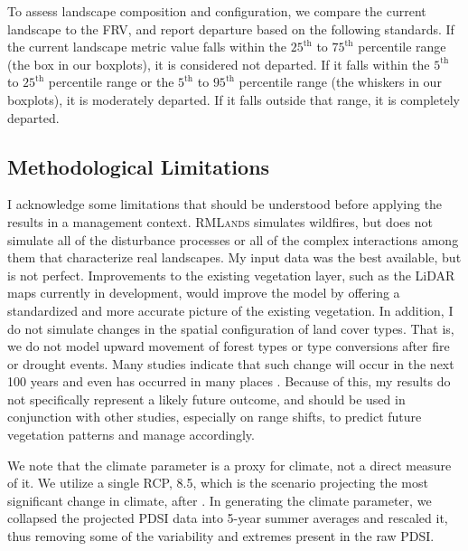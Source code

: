 To assess landscape composition and configuration, we compare the current landscape to the FRV, and report departure based on the following standards. If the current landscape metric value falls within the $25^{\text{th}}$ to $75^{\text{th}}$ percentile range (the box in our boxplots), it is considered not departed. If it falls within the $5^{\text{th}}$ to $25^{\text{th}}$ percentile range or the $5^{\text{th}}$ to $95^{\text{th}}$ percentile range (the whiskers in our boxplots), it is moderately departed. If it falls outside that range, it is completely departed.



\subsection*{Methodological Limitations}
I acknowledge some limitations that should be understood before applying the results in a management context. \textsc{RMLands} simulates wildfires, but does not simulate all of the disturbance processes or all of the complex interactions among them that characterize real landscapes. My input data was the best available, but is not perfect. Improvements to the existing vegetation layer, such as the LiDAR maps currently in development, would improve the model by offering a standardized and more accurate picture of the existing vegetation. In addition, I do not simulate changes in the spatial configuration of land cover types. That is, we do not model upward movement of forest types or type conversions after fire or drought events. Many studies indicate that such change will occur in the next 100 years and even has occurred in many places \citep{Bachelet2001}. Because of this, my results do not specifically represent a likely future outcome, and should be used in conjunction with other studies, especially on range shifts, to predict future vegetation patterns and manage accordingly. 

We note that the climate parameter is a proxy for climate, not a direct measure of it. We utilize a single RCP, 8.5, which is the scenario projecting the most significant change in climate, after \citet{Cook2014}. In generating the climate parameter, we collapsed the projected PDSI data into 5-year summer averages and rescaled it, thus removing some of the variability and extremes present in the raw PDSI.












